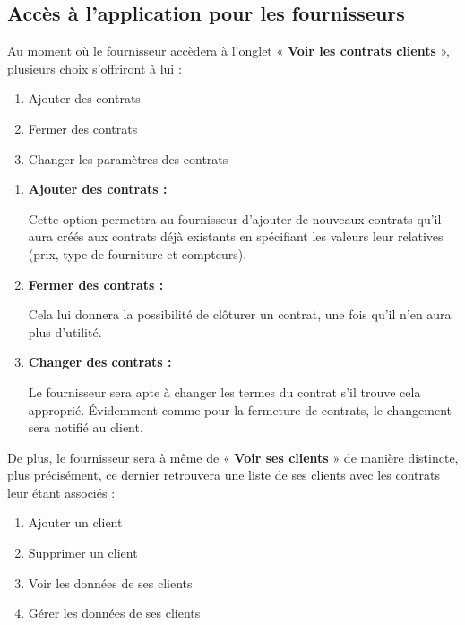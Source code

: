 \subsection{Accès à l'application pour les fournisseurs}

Au moment où le fournisseur accèdera à l’onglet \newline « \textbf{Voir les contrats clients} », plusieurs choix s’offriront à lui :
\begin{enumerate}[1.]
\item Ajouter des contrats
\item Fermer des contrats
\item Changer les paramètres des contrats
\end{enumerate}

\begin{enumerate}[-]
\item \textbf{Ajouter des contrats :} \newline

Cette option permettra au fournisseur d’ajouter de nouveaux contrats qu’il aura créés aux contrats déjà existants en spécifiant les valeurs leur relatives (prix, type de fourniture et compteurs).


\item \textbf{Fermer des contrats : }\newline

Cela lui donnera la possibilité de clôturer un contrat, une fois qu’il n’en aura plus d’utilité.

\item \textbf{Changer des contrats : }\newline

Le fournisseur sera apte à changer les termes du contrat s’il trouve cela approprié.\newline
Évidemment comme pour la fermeture de contrats, le changement sera notifié au client.
\end{enumerate}

\newpage
\begin{flushleft}
De plus, le fournisseur sera à même de « \textbf{Voir ses clients} » de manière distincte, plus précisément, ce dernier retrouvera une liste de ses clients avec les contrats leur étant associés :
\end{flushleft}
\begin{enumerate}[1.]
\item Ajouter un client
\item Supprimer un client
\item Voir les données de ses clients
\item Gérer les données de ses clients
\end{enumerate}

